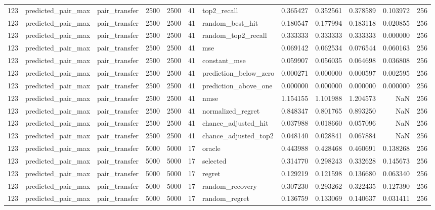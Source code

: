 \begin{tabular}{rllrrrlrrrrr}
123 & predicted_pair_max & pair_transfer & 2500 & 2500 & 41 & top2_recall & 0.365427 & 0.352561 & 0.378589 & 0.103972 & 256 \\
123 & predicted_pair_max & pair_transfer & 2500 & 2500 & 41 & random_best_hit & 0.180547 & 0.177994 & 0.183118 & 0.020855 & 256 \\
123 & predicted_pair_max & pair_transfer & 2500 & 2500 & 41 & random_top2_recall & 0.333333 & 0.333333 & 0.333333 & 0.000000 & 256 \\
123 & predicted_pair_max & pair_transfer & 2500 & 2500 & 41 & mse & 0.069142 & 0.062534 & 0.076544 & 0.060163 & 256 \\
123 & predicted_pair_max & pair_transfer & 2500 & 2500 & 41 & constant_mse & 0.059907 & 0.056035 & 0.064698 & 0.036808 & 256 \\
123 & predicted_pair_max & pair_transfer & 2500 & 2500 & 41 & prediction_below_zero & 0.000271 & 0.000000 & 0.000597 & 0.002595 & 256 \\
123 & predicted_pair_max & pair_transfer & 2500 & 2500 & 41 & prediction_above_one & 0.000000 & 0.000000 & 0.000000 & 0.000000 & 256 \\
123 & predicted_pair_max & pair_transfer & 2500 & 2500 & 41 & nmse & 1.154155 & 1.101988 & 1.204573 & NaN & 256 \\
123 & predicted_pair_max & pair_transfer & 2500 & 2500 & 41 & normalized_regret & 0.848347 & 0.801765 & 0.893250 & NaN & 256 \\
123 & predicted_pair_max & pair_transfer & 2500 & 2500 & 41 & chance_adjusted_hit & 0.037988 & 0.018660 & 0.057096 & NaN & 256 \\
123 & predicted_pair_max & pair_transfer & 2500 & 2500 & 41 & chance_adjusted_top2 & 0.048140 & 0.028841 & 0.067884 & NaN & 256 \\
123 & predicted_pair_max & pair_transfer & 5000 & 5000 & 17 & oracle & 0.443988 & 0.428468 & 0.460691 & 0.138268 & 256 \\
123 & predicted_pair_max & pair_transfer & 5000 & 5000 & 17 & selected & 0.314770 & 0.298243 & 0.332628 & 0.145673 & 256 \\
123 & predicted_pair_max & pair_transfer & 5000 & 5000 & 17 & regret & 0.129219 & 0.121598 & 0.136680 & 0.063340 & 256 \\
123 & predicted_pair_max & pair_transfer & 5000 & 5000 & 17 & random_recovery & 0.307230 & 0.293262 & 0.322435 & 0.127390 & 256 \\
123 & predicted_pair_max & pair_transfer & 5000 & 5000 & 17 & random_regret & 0.136759 & 0.133069 & 0.140637 & 0.031411 & 256 \\

\end{tabular}
